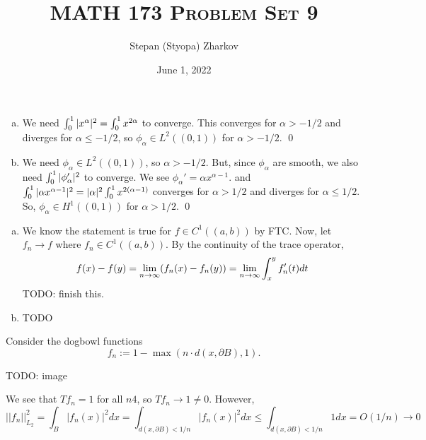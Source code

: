 \documentclass{article}
\title{\textsc{MATH 173 Problem Set 9}}
\author{Stepan (Styopa) Zharkov}
\date{June 1, 2022}
\renewcommand{\d}{\partial}
\begin{document}
\maketitle
{} 
\tri
\hop 
\solution

\newpage
{} 
\tri
\hop 
\solution
\begin{enumerate}[(a)]
    \item We need $\int_0^1 |x^\alpha|^2 = \int_0^1 x^{2\alpha}$ to converge. This converges for $\alpha > -1/2$ and diverges for $\alpha \le -1/2$, so $\phi_\alpha \in L^2((0,1))$ for $\alpha > -1/2$. \qed
    \item We need $\phi_\alpha \in L^2((0,1))$, so $\alpha > -1/2$. But, since $\phi_\alpha$ are smooth, we also need $\int_0^1 |\phi_\alpha ' |^2$ to converge. We see $\phi_\alpha' = \alpha x^{\alpha-1}$. and $\int_0^1 |\alpha x^{\alpha-1}|^2 = |\alpha|^2\int_0^1 x^{2(\alpha-1)}$ converges for $\alpha > 1/2$ and diverges for $\alpha \le 1/2$. So, $\phi_\alpha \in H^1((0,1))$ for $\alpha > 1/2$. \qed
\end{enumerate}

\newpage
{} 
\tri
\hop 
\solution
\begin{enumerate}[(a)]
    \item We know the statement is true for $f \in C^1((a,b))$ by FTC. Now, let $f_n \to f$ where $f_n \in C^1((a,b))$. By the continuity of the trace operator, 
    \[f(x) - f(y) = {\lim_{n \to \infty}} (f_n(x)-f_n(y)) = {\lim_{n \to \infty}} \int_x^yf_n'(t)dt\]
    TODO: finish this.
    \item TODO
\end{enumerate}

\newpage
{} 
\tri
\hop 
\solution

\newpage
{} 
\tri
\hop 
\solution Consider the dogbowl functions 
\[f_n := 1-\max(n\cdot d(x, \d B), 1).\]

TODO: image

We see that $Tf_n = 1$ for all $n4$, so $Tf_n \to 1 \ne 0$. However, 
\[||f_n||_{L_2}^2 = \int_B |f_n(x)|^2dx = \int_{d(x,\d B)< 1/n} |f_n(x)|^2dx \le  \int_{d(x,\d B)< 1/n} 1 dx  = O(1/n) \to 0\]
 
\newpage
{} 
\tri
\hop 
\solution

\newpage
{} 
\tri
\hop 
\solution
\end{document}
